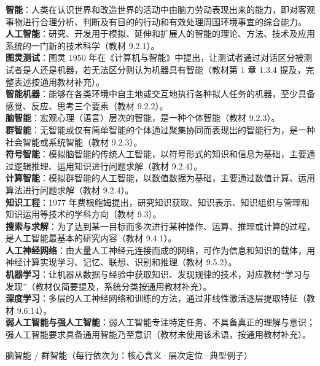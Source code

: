 \documentclass[a4paper,11pt]{article}
\begin{document}
\begin{keyterms}
\textbf{智能}：人类在认识世界和改造世界的活动中由脑力劳动表现出来的能力，即对客观事物进行合理分析、判断及有目的的行动和有效处理周围环境事宜的综合能力。\\
\textbf{人工智能}：研究、开发用于模拟、延伸和扩展人的智能的理论、方法、技术及应用系统的一门新的技术科学（教材 9.2.1）。\\
\textbf{图灵测试}：图灵 1950 年在《计算机与智能》中提出，让测试者通过对话区分被测试者是人还是机器，若无法区分则认为机器具有智能（教材第 1 章 1.3.4 提及，完整表述按通用教材补充）。\\
\textbf{智能机器}：能够在各类环境中自主地或交互地执行各种拟人任务的机器，至少具备感觉、反应、思考三个要素（教材 9.2.2）。\\
\textbf{脑智能}：宏观心理（语言）层次的智能，是一种个体智能（教材 9.2.3）。\\
\textbf{群智能}：无智能或仅有简单智能的个体通过聚集协同而表现出的智能行为，是一种社会智能或系统智能（教材 9.2.3）。\\
\textbf{符号智能}：模拟脑智能的传统人工智能，以符号形式的知识和信息为基础，主要通过逻辑推理、运用知识进行问题求解（教材 9.2.4）。\\
\textbf{计算智能}：模拟群智能的人工智能，以数值数据为基础，主要通过数值计算、运用算法进行问题求解（教材 9.2.4）。\\
\textbf{知识工程}：1977 年费根鲍姆提出，研究知识获取、知识表示、知识组织与管理和知识运用等技术的学科方向（教材 9.3）。\\
\textbf{搜索与求解}：为了达到某一目标而多次进行某种操作、运算、推理或计算的过程，是人工智能最基本的研究内容（教材 9.4.1）。\\
\textbf{人工神经网络}：由大量人工神经元连接而成的网络，可作为信息和知识的载体，用神经计算实现学习、记忆、联想、识别和推理（教材 9.5.2）。\\
\textbf{机器学习}：让机器从数据与经验中获取知识、发现规律的技术，对应教材“学习与发现”（教材仅简要提及，系统分类按通用教材补充）。\\
\textbf{深度学习}：多层的人工神经网络和训练的方法，通过非线性激活逐层提取特征（教材 9.6.14）。\\
\textbf{弱人工智能与强人工智能}：弱人工智能专注特定任务、不具备真正的理解与意识；强人工智能要求具备通用智能乃至意识（教材未使用该术语，按通用教材补充）。
\end{keyterms}

\begin{contrast}{脑智能 / 群智能（每行依次为：核心含义·层次定位·典型例子）}
\end{contrast}
\end{document}
